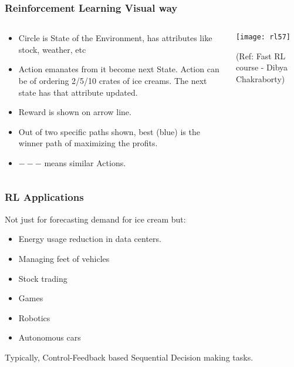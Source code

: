 \begin{frame}[fragile]\frametitle{Reinforcement Learning Visual way}

\begin{columns}
\begin{column}{0.5\textwidth}

\begin{itemize}
\item Circle is State of the Environment, has attributes like stock, weather, etc
\item Action emanates from it become next State. Action can be of ordering 2/5/10 crates of ice creams. The next state has that attribute updated.
\item Reward is shown on arrow line.
\item Out of two specific paths shown, best (blue) is the winner path of maximizing the profits.
\item $---$ means similar Actions.
\end{itemize}

\end{column}
\begin{column}{0.5\textwidth}  %


\begin{center}
\texttt{[image: rl57]}

{\tiny (Ref: Fast RL course - Dibya Chakraborty)}

\end{center}
\end{column}
\end{columns}



\end{frame}

\begin{frame}[fragile]\frametitle{RL Applications}
 Not just for forecasting demand for ice cream but:
\begin{itemize}
\item Energy usage reduction in data centers.
\item Managing feet of vehicles
\item Stock trading
\item Games
\item Robotics
\item Autonomous cars
\end{itemize}

Typically, Control-Feedback based Sequential Decision making tasks.

\end{frame}


